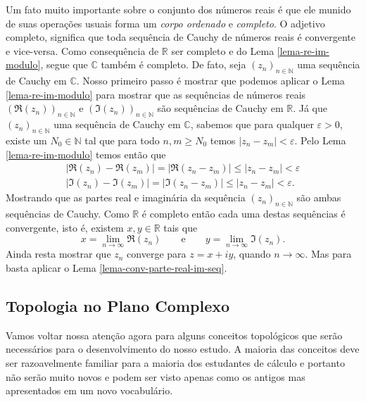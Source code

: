 Um fato muito importante sobre o conjunto dos números reais é que ele munido de suas operações usuais 
forma um \textit{corpo ordenado} e \textit{completo}.
O adjetivo completo, significa que toda sequência de Cauchy de números reais é convergente
e vice-versa. Como consequência de $\mathbb{R}$ ser completo e do Lema \ref{lema-re-im-modulo}, 
segue que $\mathbb{C}$ também é completo. 
De fato, seja $(z_n)_{n\in\mathbb{N}}$ uma sequência de Cauchy em $\mathbb{C}$.  
Nosso primeiro passo é mostrar que podemos aplicar o Lema \ref{lema-re-im-modulo} para mostrar
que as sequências de números reais $(\Re(z_n))_{n\in\mathbb{N}}$ e $(\Im(z_n))_{n\in\mathbb{N}}$
são sequências de Cauchy em $\mathbb{R}$. Já que $(z_n)_{n\in\mathbb{N}}$ uma sequência de Cauchy em $\mathbb{C}$,
sabemos que para qualquer $\varepsilon>0$, existe um $N_0\in\mathbb{N}$ tal que para todo $n,m\geqslant N_0$
temos $|z_n-z_m|<\varepsilon$. Pelo Lema \ref{lema-re-im-modulo} temos então que 
\begin{align*}
|\Re(z_n)-\Re(z_m)| = |\Re(z_n-z_m)|\leqslant |z_n-z_m|<\varepsilon
\\[0.2cm]
|\Im(z_n)-\Im(z_m)| = |\Im(z_n-z_m)|\leqslant |z_n-z_m|<\varepsilon.
\end{align*}
Mostrando que as partes real e imaginária da sequência $(z_n)_{n\in\mathbb{N}}$ são 
ambas sequências de Cauchy. Como $\mathbb{R}$ é completo então cada uma destas sequências 
é convergente, isto é, existem $x,y\in\mathbb{R}$ tais que 
\[
x=\lim_{n\to\infty} \Re(z_n) \qquad \text{e}\qquad 
y=\lim_{n\to\infty} \Im(z_n).
\]
Ainda resta mostrar que $z_n$ converge para $z=x+iy$, quando $n\to\infty$. 
Mas para basta aplicar o Lema \ref{lema-conv-parte-real-im-seq}.

\subsection{Topologia no Plano Complexo}

Vamos voltar nossa atenção agora para alguns conceitos topológicos que serão necessários
para o desenvolvimento do nosso estudo. A maioria das conceitos deve ser razoavelmente 
familiar para a maioria dos estudantes de cálculo e portanto não serão muito novos e
podem ser visto apenas como os antigos mas apresentados em um novo vocabulário. 


\medskip 

